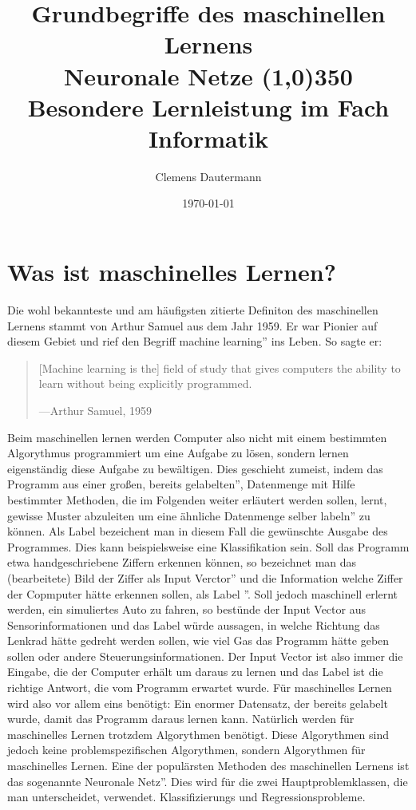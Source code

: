\documentclass{article}
\author{Clemens Dautermann}
\title{\Huge Grundbegriffe des maschinellen Lernens\\
	\bigskip
\huge Neuronale Netze \line(1,0){350}
\vspace*{10mm}
\Large Besondere Lernleistung im Fach Informatik
\vspace*{70mm}}
\date{\today{}}
\begin{document}
\biolinum
{}
\begin{titlepage}
	\maketitle
\end{titlepage}
\tableofcontents{}
\newpage

\section{Was ist maschinelles Lernen?}
Die wohl bekannteste und am häufigsten zitierte Definiton des maschinellen Lernens stammt von Arthur Samuel aus dem Jahr 1959. Er war Pionier auf diesem Gebiet und rief den Begriff \glqq machine learning'' ins Leben. So sagte er:
\begin{quote}
	[Machine learning is the] field of study that gives computers the ability to learn without being explicitly programmed\cite{1}.
	\begin{flushright}
		---Arthur Samuel, 1959
	\end{flushright}
\end{quote}
Beim maschinellen lernen werden Computer also nicht mit einem bestimmten Algorythmus programmiert um eine Aufgabe zu lösen, sondern lernen eigenständig diese Aufgabe zu bewältigen. Dies geschieht zumeist, indem das Programm aus einer großen, bereits \glqq gelabelten'', Datenmenge mit Hilfe bestimmter Methoden, die im Folgenden weiter erläutert werden sollen, lernt, gewisse Muster abzuleiten um eine ähnliche Datenmenge selber \glqq labeln'' zu können.  Als Label bezeichent man in diesem Fall die gewünschte Ausgabe des Programmes. Dies kann beispielsweise eine Klassifikation sein. Soll das Programm etwa handgeschriebene Ziffern erkennen können, so bezeichnet man das (bearbeitete) Bild der Ziffer als \glqq Input Verctor'' und die Information welche Ziffer der Copmputer hätte erkennen sollen, als \glqq Label ''. Soll jedoch maschinell erlernt werden, ein simuliertes Auto zu fahren, so bestünde der Input Vector aus Sensorinformationen und das Label würde aussagen, in welche Richtung das Lenkrad hätte gedreht werden sollen, wie viel Gas das Programm hätte geben sollen oder andere Steuerungsinformationen. Der Input Vector ist also immer die Eingabe, die der Computer erhält um daraus zu lernen und das Label ist die richtige Antwort, die vom Programm erwartet wurde. Für maschinelles Lernen wird also vor allem eins benötigt: Ein enormer Datensatz, der bereits gelabelt wurde, damit das Programm daraus lernen kann.\newline
Natürlich werden für maschinelles Lernen trotzdem Algorythmen benötigt. Diese Algorythmen sind jedoch keine problemspezifischen Algorythmen, sondern Algorythmen für maschinelles Lernen. Eine der populärsten Methoden des maschinellen Lernens ist das sogenannte \glqq Neuronale Netz''. Dies wird für die zwei Hauptproblemklassen, die man unterscheidet, verwendet. Klassifizierungs und Regressionsprobleme. 
\end{document}
